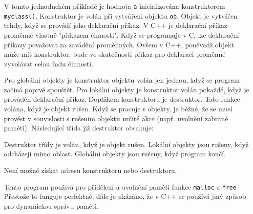       
  
      V tomto jednoduchém příkladě je hodnota \lstinline[style=luaCPPText]!a! inicializována
      konstruktorem \lstinline[style=luaCPPText]!myclass()!. Konstruktor je volán při vytváření
      objektu \lstinline[style=luaCPPText]!ob!. Objekt je vytvářen tehdy, když se provádí jeho
      deklarační příkaz. V C++ je deklarační příkaz proměnné vlastně "příkazem činnosti". Když se
      programuje v C, lze deklarační příkazy považovat za zavádění proměnných. Ovšem v C++, poněvadž
      objekt může mít konstruktor, bude ve skutečnosti příkaz pro deklaraci proměnné vyvolávat celou
      řadu činností.
  
      Pro globální objekty je konstruktor objektu volán jen jednou, když se program začíná poprvé 
      spouštět. Pro lokální objekty je konstruktor volán pokaždé, když je prováděn deklarační 
      příkaz. Doplňkem konstruktoru je destruktor. Tato funkce volána, když je objekt rušen. Když 
      se pracuje s objekty, je běžné, že se musí provést v souvislosti s rušením objektu určité 
      akce (např. uvolnění zabrané paměti). Následující třída již destruktor obsahuje:
      
  
      Destruktor třídy je volán, když je objekt rušen. Lokální objekty jsou rušeny, když odcházejí 
      mimo oblast. Globální objekty jsou rušeny, když program končí.
  
      Není možné získat adresu konstruktoru nebo destruktoru.
      

      

      Tento program používá pro přidělení a uvolnění paměti funkce
      \lstinline[style=luaCPPText]!malloc! a \lstinline[style=luaCPPText]!free! Přestože to funguje
      perfektně, dále je ukázáno, že v C++ se používá jiný způsob pro dynamickou správu paměti.   

